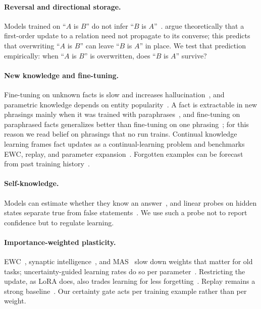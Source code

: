 \documentclass[11pt]{article}
\begin{document}
\paragraph{Reversal and directional storage.}
Models trained on ``$A$ is $B$'' do not infer ``$B$ is $A$''~\citep{berglund2024reversal}.
\citet{chang2026dynamics} argue theoretically that a first-order update to a relation need not propagate to its converse; this predicts that overwriting ``$A$ is $B$'' can leave ``$B$ is $A$'' in place.
We test that prediction empirically: when ``$A$ is $B$'' is overwritten, does ``$B$ is $A$'' survive?

\paragraph{New knowledge and fine-tuning.}
Fine-tuning on unknown facts is slow and increases hallucination~\citep{gekhman2024finetuning}, and parametric knowledge depends on entity popularity~\citep{mallen2023when}.
A fact is extractable in new phrasings mainly when it was trained with paraphrases~\citep{allenzhu2024physics}, and fine-tuning on paraphrased facts generalizes better than fine-tuning on one phrasing~\citep{mecklenburg2024injecting}; for this reason we read belief on phrasings that no run trains.
Continual knowledge learning frames fact updates as a continual-learning problem and benchmarks EWC, replay, and parameter expansion~\citep{jang2022towards}.
Forgotten examples can be forecast from past training history~\citep{jin2024what,jin2025demystifying}.

\paragraph{Self-knowledge.}
Models can estimate whether they know an answer~\citep{kadavath2022language}, and linear probes on hidden states separate true from false statements~\citep{azaria2023internal,marks2024geometry}.
We use such a probe not to report confidence but to regulate learning.

\paragraph{Importance-weighted plasticity.}
EWC~\citep{kirkpatrick2017overcoming}, synaptic intelligence~\citep{zenke2017continual}, and MAS~\citep{aljundi2018memory} slow down weights that matter for old tasks; uncertainty-guided learning rates do so per parameter~\citep{ebrahimi2020uncertainty}.
Restricting the update, as LoRA does, also trades learning for less forgetting~\citep{biderman2024lora}.
Replay remains a strong baseline~\citep{rolnick2019experience,chaudhry2019tiny}.
Our certainty gate acts per training example rather than per weight.
\end{document}
